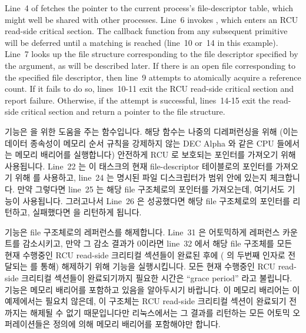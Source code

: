 Line~4 of  fetches the pointer to the current
process's file-descriptor table, which might well be shared
with other processes.
Line~6 invokes , which
enters an RCU read-side critical section.
The callback function from any subsequent  primitive
will be deferred until a matching  is reached
(line~10 or~14 in this example).
Line~7 looks up the file structure corresponding to the file
descriptor specified by the  argument, as will be
described later.
If there is an open file corresponding to the specified file descriptor,
then line~9 attempts to atomically acquire a reference count.
If it fails to do so, lines~10-11 exit the RCU read-side critical
section and report failure.
Otherwise, if the attempt is successful, lines~14-15 exit the read-side
critical section and return a pointer to the file structure.
\fi

 기능은  을 위한 도움을 주는 함수입니다.
해당 함수는 나중의 디레퍼런싱을 위해 (이는 데이터 종속성이 메모리 순서 규칙을
강제하지 않는 DEC Alpha 와 같은 CPU 들에서는 메모리 배리어를 실행합니다)
안전하게 RCU 로 보호되는 포인터를 가져오기 위해 사용됩니다.
Line~22 는 이 태스크의 현재 file-descriptor 테이블로의 포인터를 가져오기 위해
 를 사용하고, line~24 는 명시된 파일 디스크립터가 범위
안에 있는지 체크합니다.
만약 그렇다면 line~25 는 해당 file 구조체로의 포인터를 가져오는데, 여기서도
 기능이 사용됩니다.
그러고나서 Line~26 은 성공했다면 해당 file 구조체로의 포인터를 리턴하고,
실패했다면  을 리턴하게 됩니다.
\iffalse

The \co{fcheck_files()} primitive is a helper function for
\co{fget()}.
It uses the \co{rcu_dereference()} primitive to safely fetch an
RCU-protected pointer for later dereferencing (this emits a
memory barrier on CPUs such as DEC Alpha in which data dependencies
do not enforce memory ordering).
Line~22 uses \co{rcu_dereference()} to fetch a pointer to this
task's current file-descriptor table,
and line~24 checks to see if the specified file descriptor is in range.
If so, line~25 fetches the pointer to the file structure, again using
the \co{rcu_dereference()} primitive.
Line~26 then returns a pointer to the file structure or \co{NULL}
in case of failure.
\fi

 기능은 file 구조체로의 레퍼런스를 해제합니다.
Line~31 은 어토믹하게 레퍼런스 카운트를 감소시키고, 만약 그 감소 결과가 0이라면
line~32 에서 해당 file 구조체를 모든 현재 수행중인 RCU read-side 크리티컬
섹션들이 완료된 후에 ( 의 두번째 인자로 전달되는
 를 통해) 해제하기 위해  기능을
실행시킵니다.
모든 현재 수행중인 RCU read-side 크리티컬 섹션들이 완료되기까지 필요한 시간은
``grace period'' 라고 불립니다.
 기능은 메모리 배리어를 포함하고 있음을 알아두시기
바랍니다.
이 메모리 배리어는 이 예제에서는 필요치 않은데, 이 구조체는 RCU read-side
크리티컬 섹션이 완료되기 전까지는 해제될 수 없기 때문입니다만 리눅스에서는 그
결과를 리턴하는 모든 어토믹 오퍼레이션들은 정의에 의해 메모리 배리어를
포함해야만 합니다.
\iffalse


